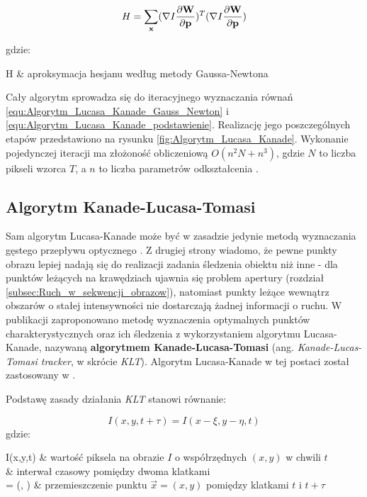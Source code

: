 \begin{equation}
\label{equ:Algorytm_Lucasa_Kanade_hesjan}
	H = \sum\limits_{\mathbf{x}}(\nabla I \frac{\partial \mathbf{W}}{\partial \mathbf{p}})^T (\nabla I \frac{\partial \mathbf{W}}{\partial \mathbf{p}})
\end{equation}

\noindent
gdzie:
\begin{conditions}
	H & aproksymacja hesjanu według metody Gaussa-Newtona \\
\end{conditions}

Cały algorytm sprowadza się do iteracyjnego wyznaczania równań \ref{equ:Algorytm_Lucasa_Kanade_Gauss_Newton} i \ref{equ:Algorytm_Lucasa_Kanade_podstawienie}. Realizację jego poszczególnych etapów przedstawiono na rysunku \ref{fig:Algorytm_Lucasa_Kanade}. Wykonanie pojedynczej iteracji ma złożoność obliczeniową $O(n^2 N + n^3)$, gdzie $N$ to liczba pikseli wzorca $T$, a $n$ to liczba parametrów odkształcenia \cite{Baker2004}.

\subsection{Algorytm Kanade-Lucasa-Tomasi}
\label{subsec:Algorytm_Kanade_Lucasa_Tomasi}

Sam algorytm Lucasa-Kanade może być w zasadzie jedynie metodą wyznaczania gęstego przepływu optycznego \cite{Yilmaz2006}. Z drugiej strony wiadomo, że pewne punkty obrazu lepiej nadają się do realizacji zadania śledzenia obiektu niż inne \cite{Tomasi1991} - dla punktów leżących na krawędziach ujawnia się problem apertury (rozdział \ref{subsec:Ruch_w_sekwencji_obrazow}), natomiast punkty leżące wewnątrz obszarów o stałej intensywności nie dostarczają żadnej informacji o ruchu. W publikacji \cite{Tomasi1991} zaproponowano metodę wyznaczenia optymalnych punktów charakterystycznych oraz ich śledzenia z wykorzystaniem algorytmu Lucasa-Kanade, nazywaną \textbf{algorytmem Kanade-Lucasa-Tomasi} (ang. \textit{Kanade-Lucas-Tomasi tracker}, w skrócie \textit{KLT}). Algorytm Lucasa-Kanade w tej postaci został zastosowany w \cite{Liem2008}.

Podstawę zasady działania \textit{KLT} stanowi równanie:

\begin{equation}
\label{equ:Algorytm_Lucasa_Kanade_Tomasi_podstawowe_rówanie}
	I(x, y, t + \tau) = I(x - \xi, y - \eta, t)
\end{equation}
\noindent
gdzie:
\begin{conditions}
	I(x,y,t) & wartość piksela na obrazie $I$ o współrzędnych $(x,y)$ w chwili $t$ \\
	\tau & interwał czasowy pomiędzy dwoma klatkami \\
	 = (\xi, \eta) & przemieszczenie punktu $\vec{x} = (x, y)$ pomiędzy klatkami $t$ i $t + \tau$ \\
\end{conditions}

